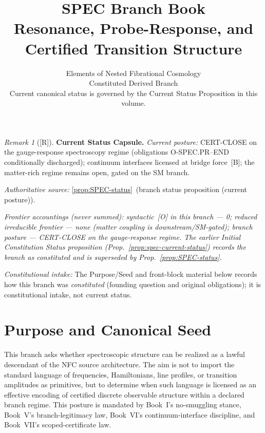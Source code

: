 \documentclass[12pt,oneside]{amsbook}
\theoremstyle{plain}
\theoremstyle{definition}
\theoremstyle{remark}
\newtheorem{remark}[theorem]{Remark}
\newcommand{\status}[1]{\textup{[#1]}}
\begin{document}
\title{SPEC Branch Book\\[6pt]
 Resonance, Probe-Response, and Certified Transition Structure}
\author{Elements of Nested Fibrational Cosmology\\
 Constituted Derived Branch\\
 {\normalsize Current canonical status is governed by the Current Status Proposition in this volume.}}
\date{}
\maketitle
\tableofcontents
\newpage


\begin{remark}[\status{R}]\label{cap:SPEC-status}
\textbf{Current Status Capsule.}
\emph{Current posture:} CERT-CLOSE on the gauge-response spectroscopy regime (obligations O-SPEC.PR--END conditionally discharged); continuum interfaces licensed at bridge force~[B]; the matter-rich regime remains open, gated on the SM branch.

\emph{Authoritative source:} \ref{prop:SPEC-status}~(branch status proposition (current posture)).

\emph{Frontier accountings (never summed): syntactic~[O] in this branch --- 0; reduced irreducible frontier --- none (matter coupling is downstream/SM-gated); branch posture --- CERT-CLOSE on the gauge-response regime. The earlier \emph{Initial Constitution Status} proposition (Prop.~\ref{prop:spec-current-status}) records the branch as constituted and is superseded by Prop.~\ref{prop:SPEC-status}.}

\emph{Constitutional intake:} The Purpose/Seed and front-block material below records how this branch was \emph{constituted} (founding question and original obligations); it is constitutional intake, not current status.
\end{remark}

\section{Purpose and Canonical Seed}\label{sec:spec-purpose}

This branch asks whether spectroscopic structure can be realized as a
lawful descendant of the NFC source architecture. The aim is not to
import the standard language of frequencies, Hamiltonians, line profiles,
or transition amplitudes as primitives, but to determine when such
language is licensed as an effective encoding of certified discrete
observable structure within a declared branch regime. This posture is
mandated by Book~I's no-smuggling stance, Book~V's branch-legitimacy
law, Book~VI's continuum-interface discipline, and Book~VII's
scoped-certificate law.
\end{document}
